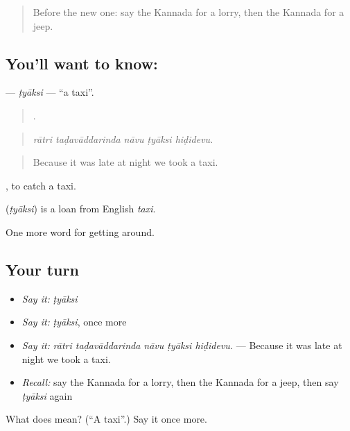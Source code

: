 \begin{quote}
Before the new one: say the Kannada for a lorry, then the Kannada for a jeep.
\end{quote}

\subsection*{You'll want to know: }
\textbf{} — \emph{ṭyāksi} — \textquotedblleft{}a taxi\textquotedblright{}.

\begin{quote}
    .
\end{quote}

\begin{quote}
\emph{rātri taḍavāddarinda nāvu ṭyāksi hiḍidevu.}
\end{quote}

\begin{quote}
Because it was late at night we took a taxi.
\end{quote}

 , to catch a taxi.

\begin{cousinweb}
\textbf{} (\emph{ṭyāksi}) is a loan from English \emph{taxi}.
\end{cousinweb}

\begin{grammarlens}[title={What you've built}]
One more word for getting around.
\end{grammarlens}

\subsection*{Your turn}
\begin{itemize}
\raggedright
  \item \emph{Say it:} \emph{ṭyāksi}
  \item \emph{Say it:} \emph{ṭyāksi}, once more
  \item \emph{Say it:} \emph{rātri taḍavāddarinda nāvu ṭyāksi hiḍidevu.} — Because it was late at night we took a taxi.
  \item \emph{Recall:} say the Kannada for a lorry, then the Kannada for a jeep, then say \emph{ṭyāksi} again
\end{itemize}

\begin{tcolorbox}[breakable,colback=teal!4,colframe=teal!35!black,title={Before you move on}]
What does  mean? (\textquotedblleft{}A taxi\textquotedblright{}.) Say it once more.
\end{tcolorbox}
